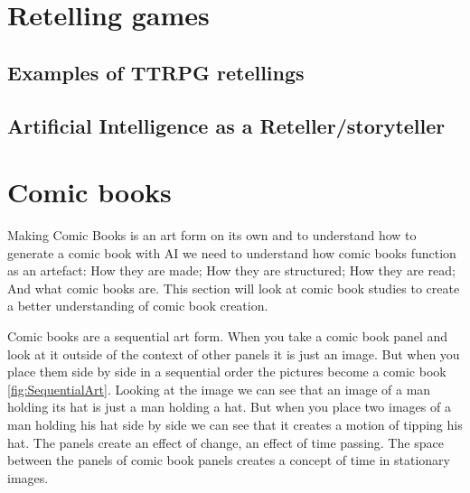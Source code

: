 \section{Retelling games}

\subsection{Examples of TTRPG retellings}

\subsection{Artificial Intelligence as a Reteller/storyteller}

\section{Comic books}
Making Comic Books is an art form on its own and to understand how to generate a comic book with AI we need to understand how comic books function as an artefact: How they are made; How they are structured; How they are read; And what comic books are. This section will look at comic book studies to create a better understanding of comic book creation.

Comic books are a sequential art form\cite{eisner2008comics}. When you take a comic book panel and look at it outside of the context of other panels it is just an image. But when you place them side by side in a sequential order the pictures become a comic book \ref{fig:SequentialArt}. Looking at the image we can see that an image of a man holding its hat is just a man holding a hat. But when you place two images of a man holding his hat side by side we can see that it creates a motion of tipping his hat. The panels create an effect of change, an effect of time passing. The space between the panels of comic book panels creates a concept of time in stationary images. 

